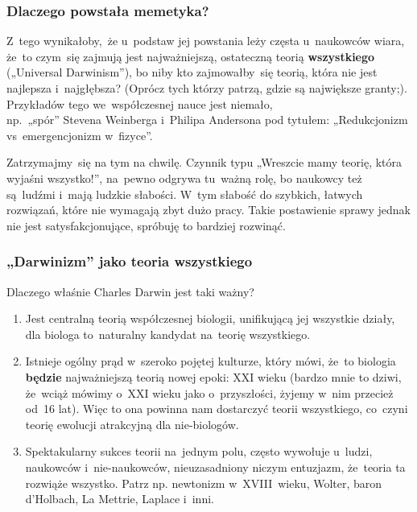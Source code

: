 \documentclass[10pt,t]{beamer}
\begin{document}
\begin{frame}
  \frametitle{Dlaczego powstała memetyka?}


  Z~tego wynikałoby,~że
  u~podstaw jej powstania leży częsta u~naukowców wiara, że~to
  czym~się zajmują jest najważniejszą, ostateczną teorią
  \textbf{wszystkiego} („Universal Darwinism”), bo niby kto
  zajmowałby~się teorią, która nie jest najlepsza i~najgłębsza?
  (Oprócz tych którzy patrzą, gdzie są największe granty;).
  Przykładów tego we~współczesnej nauce jest niemało, \\
  np.~„spór” Stevena Weinberga i~Philipa Andersona pod tytułem:
  „Redukcjonizm vs~emergencjonizm w~fizyce”.

  Zatrzymajmy~się na tym na chwilę. Czynnik typu „Wreszcie mamy teorię,
  która wyjaśni wszystko!”,
  na~pewno odgrywa tu~ważną rolę, bo naukowcy też są~ludźmi i~mają
  ludzkie słabości. W~tym słabość do szybkich, łatwych rozwiązań,
  które nie wymagają zbyt dużo pracy. Takie postawienie sprawy
  jednak nie jest satysfakcjonujące, spróbuję to bardziej rozwinąć.

\end{frame}





\begin{frame}
  \frametitle{„Darwinizm” jako teoria wszystkiego}


  Dlaczego właśnie Charles Darwin jest taki ważny?

  \begin{enumerate}

  \item Jest centralną teorią współczesnej biologii, unifikującą jej
    wszystkie działy, dla biologa to~naturalny kandydat na~teorię
    wszystkiego.

  \item Istnieje ogólny prąd w~szeroko pojętej kulturze, który mówi,
    że~to biologia \textbf{będzie} najważniejszą teorią nowej epoki: XXI
    wieku (bardzo mnie to dziwi, że~wciąż mówimy o~XXI wieku jako
    o~przyszłości, żyjemy w~nim przecież od~16 lat). Więc to ona
    powinna nam dostarczyć teorii wszystkiego, co~czyni teorię
    ewolucji atrakcyjną dla nie-biologów.

  \item Spektakularny sukces teorii na~jednym polu, często wywołuje
    u~ludzi, naukowców i~nie-naukowców, nieuzasadniony niczym
    entuzjazm, że~teoria ta rozwiąże wszystko. Patrz np. newtonizm
    w~XVIII~wieku, Wolter, baron d'Holbach, La Mettrie, Laplace
    i~inni.

  \end{enumerate}

\end{frame}
\end{document}
